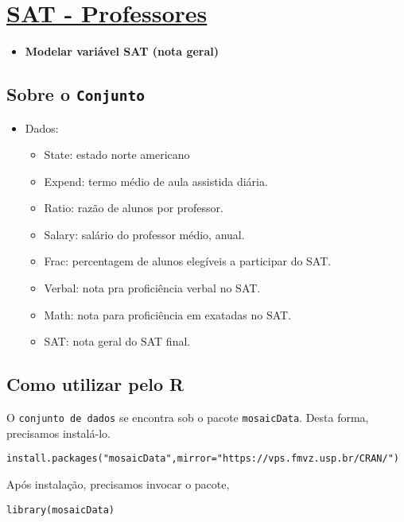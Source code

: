 \documentclass[12pt]{abntex2}
\begin{document}
\section{\href{https://r-data.pmagunia.com/dataset/r-dataset-package-mosaicdata-sat}{SAT - Professores}}
\label{sec:org7add5d8}
\begin{itemize}
\item \textbf{Modelar variável SAT (nota geral)}
\end{itemize}
\subsection{Sobre o \texttt{Conjunto}}
\label{sec:org35a3fdd}
\begin{itemize}
\item Dados:
\begin{itemize}
\item State: estado norte americano
\item Expend: termo médio de aula assistida diária.
\item Ratio: razão de alunos por professor.
\item Salary: salário do professor médio, anual.
\item Frac: percentagem de alunos elegíveis a participar do SAT.
\item Verbal: nota pra proficiência verbal no SAT.
\item Math: nota para proficiência em exatadas no SAT.
\item SAT: nota geral do SAT final.
\end{itemize}
\end{itemize}

\subsection{Como utilizar pelo R}
\label{sec:orge4ae9b7}

O \texttt{conjunto de dados} se encontra sob o pacote \texttt{mosaicData}. Desta forma, precisamos
instalá-lo.

\begin{verbatim}
install.packages("mosaicData",mirror="https://vps.fmvz.usp.br/CRAN/")
\end{verbatim}

Após instalação, precisamos invocar o pacote,
\begin{verbatim}
library(mosaicData)
\end{verbatim}
\end{document}
